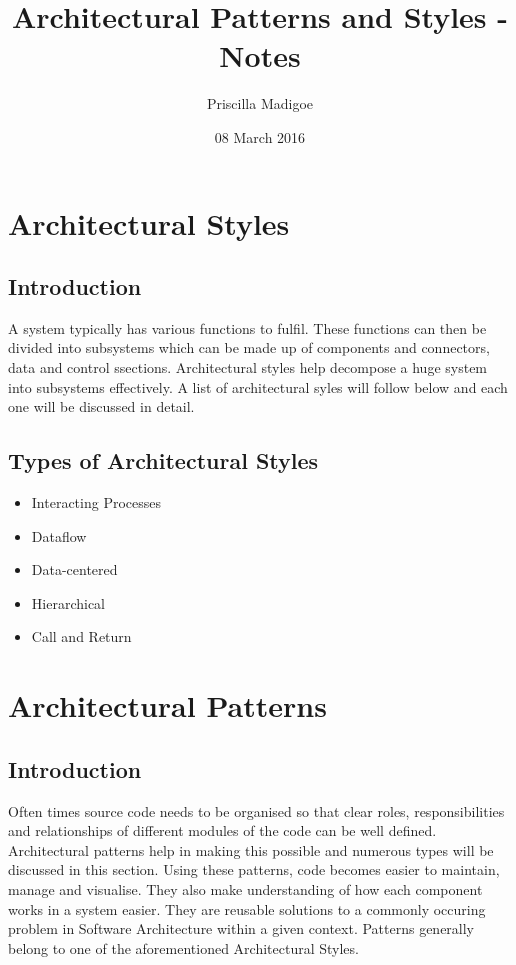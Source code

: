 \documentclass[a4paper,12pt]{article}
\begin{document}
\title{Architectural Patterns and Styles - Notes}
\author{Priscilla Madigoe}
\date{08 March 2016}
\maketitle


\section{Architectural Styles}

\subsection{Introduction}
A system typically has various functions to fulfil. These functions can then be divided into subsystems which can be made up of components and connectors, data and control ssections. Architectural styles help decompose a huge system into subsystems effectively. A list of architectural syles will follow below and each one will be discussed in detail. 

\subsection{Types of Architectural Styles}
\begin{itemize}
\item Interacting Processes
\item Dataflow
\item Data-centered
\item Hierarchical
\item Call and Return
\end{itemize}
 
\section{Architectural Patterns}

\subsection{Introduction}
Often times source code needs to be organised so that clear roles, responsibilities and relationships of different modules of the code can be well defined. Architectural patterns help in making this possible and numerous types will be discussed in this section. Using these patterns, code becomes easier to maintain, manage and visualise. They also make understanding of how each component works in a system easier. They are reusable solutions to a commonly occuring problem in Software Architecture within a given context. Patterns generally belong to one of the aforementioned Architectural Styles.
\end{document}
